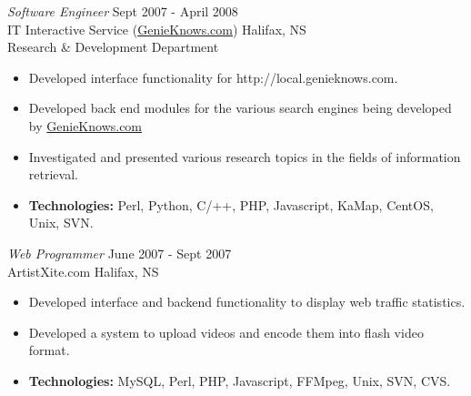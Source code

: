 \documentclass[line,margin]{res}
\begin{document}
\begin{resume}
   {\sl Software Engineer} \hfill Sept 2007 - April 2008 \\
    IT Interactive Service (\href{http://www.genieknows.com}{GenieKnows.com}) \hfill Halifax, NS \\
    Research {\&} Development Department \smallskip
    \begin{itemize}  \itemsep -2pt %
     \item Developed interface functionality for
             http://local.genieknows.com.
     \item Developed back end modules for the various search
             engines being developed by
             \href{http://www.genieknows.com}{GenieKnows.com}
     \item Investigated and presented various research topics
             in the fields of information retrieval.
     \item {\bf Technologies:} \hspace{1pt}
        Perl, Python, C/++, PHP, Javascript, KaMap, CentOS, \\
        \hspace*{72pt} Unix, SVN.
    \end{itemize}

\newpage
\opening
\addvspace{\sectionskip}


   {\sl Web Programmer} \hfill June 2007 - Sept 2007 \\
    ArtistXite.com \hfill Halifax, NS \smallskip
    \begin{itemize}  \itemsep -2pt %
     \item Developed interface and backend functionality to display
               web traffic statistics.
     \item Developed a system to upload videos and encode them
                into flash video format.
     \item {\bf Technologies:}\hspace{4pt}
        MySQL, Perl, PHP, Javascript, FFMpeg, Unix, SVN, CVS.
    \end{itemize}


\end{resume}
\end{document}
